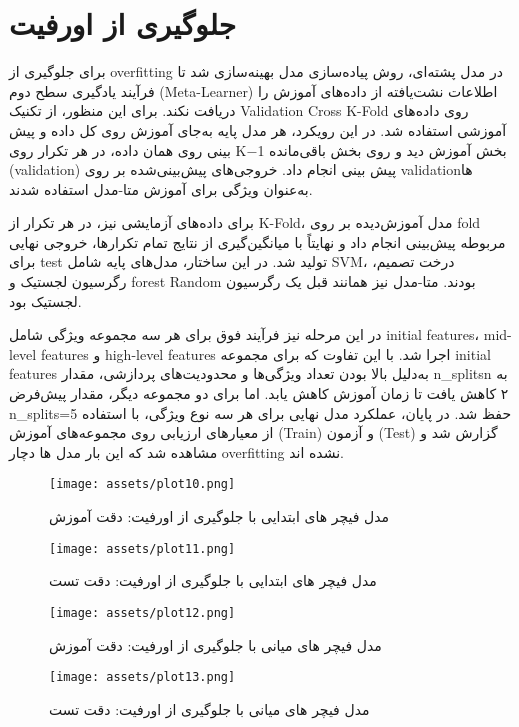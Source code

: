 \documentclass[a4paper,12pt]{article}
\begin{document}
\pagebreak

\section*{جلوگیری از اورفیت}
برای جلوگیری از overfitting در مدل پشته‌ای، روش پیاده‌سازی مدل بهینه‌سازی شد تا فرآیند یادگیری سطح دوم (Meta-Learner) اطلاعات نشت‌یافته از داده‌های آموزش را دریافت نکند. برای این منظور، از تکنیک
 Validation Cross K-Fold   
 روی داده‌های آموزشی استفاده شد. در این رویکرد، هر مدل پایه به‌جای آموزش روی کل داده و پیش ‌بینی روی همان داده، در هر تکرار روی K−1 بخش آموزش دید و روی بخش باقی‌مانده (validation) پیش ‌بینی انجام داد. خروجی‌های پیش‌بینی‌شده بر روی validationها به‌عنوان ویژگی برای آموزش متا-مدل استفاده شدند.
 
برای داده‌های آزمایشی نیز، در هر تکرار از K-Fold، مدل آموزش‌دیده بر روی fold مربوطه پیش‌بینی انجام داد و نهایتاً با میانگین‌گیری از نتایج تمام تکرارها، خروجی نهایی برای test تولید شد. در این ساختار، مدل‌های پایه شامل SVM، درخت تصمیم، رگرسیون لجستیک و
forest Random 
 بودند. متا-مدل نیز همانند قبل یک رگرسیون لجستیک بود.

در این مرحله نیز فرآیند فوق برای هر سه مجموعه ویژگی شامل initial features، mid-level features و high-level features اجرا شد. با این تفاوت که برای مجموعه initial features به‌دلیل بالا بودن تعداد ویژگی‌ها و محدودیت‌های پردازشی، مقدار n\_splitsn به ۲ کاهش یافت تا زمان آموزش کاهش یابد. اما برای دو مجموعه دیگر، مقدار پیش‌فرض n\_splits=5 حفظ شد.
در پایان، عملکرد مدل نهایی برای هر سه نوع ویژگی، با استفاده از معیارهای ارزیابی روی مجموعه‌های آموزش (Train) و آزمون (Test) گزارش شد و مشاهده شد که این بار مدل ها دچار overfitting نشده اند.

\pagebreak
\begin{figure}[h]
	\centering
	\begin{minipage}[t]{0.40\textwidth}
		\centering
		\texttt{[image: assets/plot10.png]}
		\caption{\textcolor{CustomAccent}{مدل فیچر های ابتدایی با جلوگیری از اورفیت: دقت آموزش }}
	\end{minipage}
	\hfill
	\begin{minipage}[t]{0.40\textwidth}
		\centering
		\texttt{[image: assets/plot11.png]}
		\caption{\textcolor{CustomAccent}{مدل فیچر های ابتدایی با جلوگیری از اورفیت: دقت تست}}
	\end{minipage}
	\hfill
\end{figure}


\begin{figure}[h]
	\centering
	\begin{minipage}[t]{0.40\textwidth}
		\centering
		\texttt{[image: assets/plot12.png]}
		\caption{\textcolor{CustomAccent}{مدل فیچر های میانی با جلوگیری از اورفیت: دقت آموزش }}
	\end{minipage}
	\hfill
	\begin{minipage}[t]{0.40\textwidth}
		\centering
		\texttt{[image: assets/plot13.png]}
		\caption{\textcolor{CustomAccent}{مدل فیچر های میانی با جلوگیری از اورفیت: دقت تست}}
	\end{minipage}
	\hfill
\end{figure}
\end{document}

